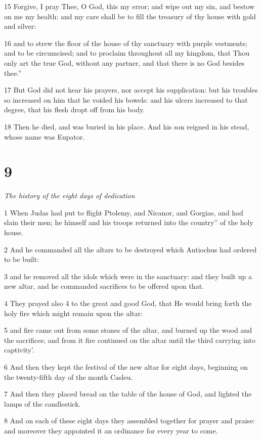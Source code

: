 15 Forgive, I pray Thee, O God, this my error; and wipe out my sin, and bestow on me my health: and my care shall be to fill the treasury of thy house with gold and silver: 

16 and to strew the floor of the house of thy sanctuary with purple vestments; and to be circumcised; and to proclaim throughout all my kingdom, that Thou only art the true God, without any partner, and that there is no God besides thee.” 

17 But God did not hear his prayers, nor accept his supplication: but his troubles so increased on him that he voided his bowels: and his ulcers increased to that degree, that his flesh dropt off from his body. 

18 Then he died, and was buried in his place. And his son reigned in his stead, whose name was Eupator.

\chapter{9}

\par \textit{The history of the eight days of dedication}

1 When Judas had put to flight Ptolemy, and Nicanor, and Gorgias, and had slain their men; he himself and his troops returned into the country” of the holy house. 

2 And he commanded all the altars to be destroyed which Antiochus had ordered to be built: 

3 and he removed all the idols which were in the sanctuary: and they built up a new altar, and he commanded sacrifices to be offered upon that. 

4 They prayed also 4 to the great and good God, that He would bring forth the holy fire which might remain upon the altar: 

5 and fire came out from some stones of the altar, and burned up the wood and the sacrifices; and from it fire continued on the altar until the third carrying into captivity’. 

6 And then they kept the festival of the new altar for eight days, beginning on the twenty-fifth day of the month Casleu. 

7 And then they placed bread on the table of the house of God, and lighted the lamps of the candlestick. 

8 And on each of these eight days they assembled together for prayer and praise: and moreover they appointed it an ordinance for every year to come. 

